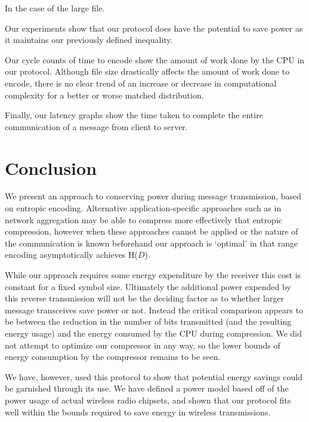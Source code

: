 \documentclass[conference]{IEEEtran}
\begin{document}
In the case of the large file.

Our experiments show that our protocol does have the potential to save power
as it maintains our previously defined inequality.

Our cycle counts of time to encode show the amount of work done by the CPU in 
our protocol.  Although file size drastically affects the amount of work done 
to encode, there is no clear trend of an increase or decrease in computational 
complexity for a better or worse matched distribution.

Finally, our latency graphs show the time taken to complete the entire 
communication of a message from client to server.

\section{Conclusion}

We present an approach to conserving power during message
transmission, based on entropic encoding.  Alternative
application-specific approaches such as in network aggregation may be
able to compress more effectively that entropic compression, however
when these approaches cannot be applied or the nature of the
communication is known beforehand our approach is `optimal' in that 
range encoding asymptotically achieves H($D$).

While our approach requires some energy expenditure by the receiver
this cost is constant for a fixed symbol size.  Ultimately the
additional power expended by this reverse transmission will not be the
deciding factor as to whether larger message transceives save power or
not.  Instead the critical comparison appears to be between the
reduction in the number of bits transmitted (and the resulting energy
usage) and the energy consumed by the CPU during compression.  We did
not attempt to optimize our compressor in any way, so the lower bounds
of energy consumption by the compressor remains to be seen.

We have, however, used this protocol to show that potential energy savings 
could be garnished through its use.  We have defined a power model based off
of the power usage of actual wireless radio chipsets, and shown that our 
protocol fits well within the bounds required to save energy in wireless
transmissions.



\end{document}
